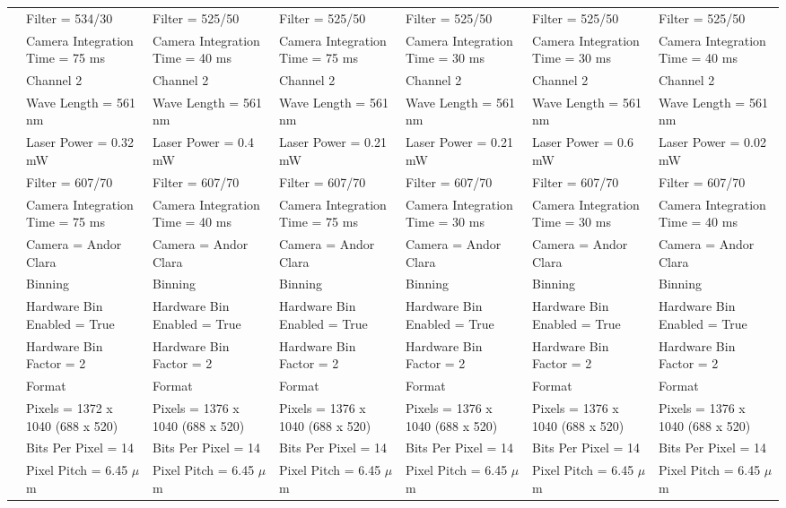 \begin{sidewaystable}[!ht]
\begin{longtable}{@{} l l l l l l l @{}}
& Filter = 534/30 & Filter = 525/50 & Filter = 525/50 & Filter = 525/50 & Filter = 525/50 & Filter = 525/50\\
& Camera Integration Time = 75 ms & Camera Integration Time = 40 ms & Camera Integration Time = 75 ms & Camera Integration Time = 30 ms & Camera Integration Time = 30 ms & Camera Integration Time = 40 ms\\
& Channel 2 & Channel 2 & Channel 2 & Channel 2 & Channel 2 & Channel 2\\
& Wave Length = 561 nm & Wave Length = 561 nm & Wave Length = 561 nm & Wave Length = 561 nm & Wave Length = 561 nm & Wave Length = 561 nm\\
& Laser Power = 0.32 mW & Laser Power = 0.4 mW & Laser Power = 0.21 mW & Laser Power = 0.21 mW & Laser Power = 0.6 mW & Laser Power = 0.02 mW\\
& Filter = 607/70 & Filter = 607/70 & Filter = 607/70 & Filter = 607/70 & Filter = 607/70 & Filter = 607/70\\
& Camera Integration Time = 75 ms & Camera Integration Time = 40 ms & Camera Integration Time = 75 ms & Camera Integration Time = 30 ms & Camera Integration Time = 30 ms & Camera Integration Time = 40 ms\\
& Camera = Andor Clara & Camera = Andor Clara & Camera = Andor Clara & Camera = Andor Clara & Camera = Andor Clara & Camera = Andor Clara\\
& Binning & Binning & Binning & Binning & Binning & Binning\\
& Hardware Bin Enabled = True & Hardware Bin Enabled = True & Hardware Bin Enabled = True & Hardware Bin Enabled = True & Hardware Bin Enabled = True & Hardware Bin Enabled = True\\
& Hardware Bin Factor = 2 & Hardware Bin Factor = 2 & Hardware Bin Factor = 2 & Hardware Bin Factor = 2 & Hardware Bin Factor = 2 & Hardware Bin Factor = 2\\
& Format & Format & Format & Format & Format & Format\\
& Pixels = 1372 x 1040 (688 x 520) & Pixels = 1376 x 1040 (688 x 520) & Pixels = 1376 x 1040 (688 x 520) & Pixels = 1376 x 1040 (688 x 520) & Pixels = 1376 x 1040 (688 x 520) & Pixels = 1376 x 1040 (688 x 520)\\
& Bits Per Pixel = 14 & Bits Per Pixel = 14 & Bits Per Pixel = 14 & Bits Per Pixel = 14 & Bits Per Pixel = 14 & Bits Per Pixel = 14\\
& Pixel Pitch = 6.45 $\mu$m & Pixel Pitch = 6.45 $\mu$m & Pixel Pitch = 6.45 $\mu$m & Pixel Pitch = 6.45 $\mu$m & Pixel Pitch = 6.45 $\mu$m & Pixel Pitch = 6.45 $\mu$m\\

\end{longtable}
\end{sidewaystable}
